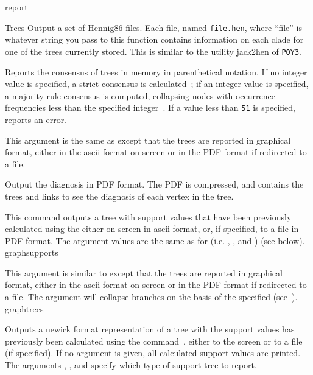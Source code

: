 \begin{command}{report}{}
\begin{arguments}
\begin{argumentgroup}{Trees}
{Output a set of Hennig86 files. Each file, named \texttt{file.hen},
where ``file'' is whatever string you pass to this function
contains information on each clade for one of the trees
currently stored. This is similar to the utility jack2hen 
of \texttt{POY3}.}
{}

{Reports the consensus of trees in memory in parenthetical notation.
If no integer value is specified, a strict consensus is calculated~\cite{schuh1980};
if an integer value is specified, a majority rule consensus is computed, 
collapsing nodes with occurrence frequencies less than the specified 
integer~\cite{margush1981}. If a value less than \texttt{51} is specified, 
\poy reports an error.} 
{}

{This argument is the same as  except 
that the trees are reported in graphical format, either in the ascii 
format on screen or in the PDF format if redirected to a file.}
{}

{Output the diagnosis in PDF format. The PDF is compressed, and
contains the trees and links to see the diagnosis of each vertex
in the tree.}
{}

{This command outputs a tree with support values that have
been previously calculated using the
 either on screen
in ascii format, or, if specified, to a file in PDF
format. The argument values are the same as for 
 (i.e. ,
, and )
(see below).} 
{graphsupports}

{This argument is similar to  except that
the trees are reported in graphical format, either in the ascii 
format on screen or in the PDF format if redirected to a file.
The argument  will collapse branches on the basis 
of the \poylident specified (see~).}
{graphtrees}

{Outputs a newick format representation of a tree with the
support values has previously been calculated using the
command~,
either to the screen or to a file (if specified). If no argument
is given, all calculated support values are printed. The arguments
, , and
 specify which type of support tree to
report. 

}
\end{argumentgroup}
\end{arguments}
\end{command}
